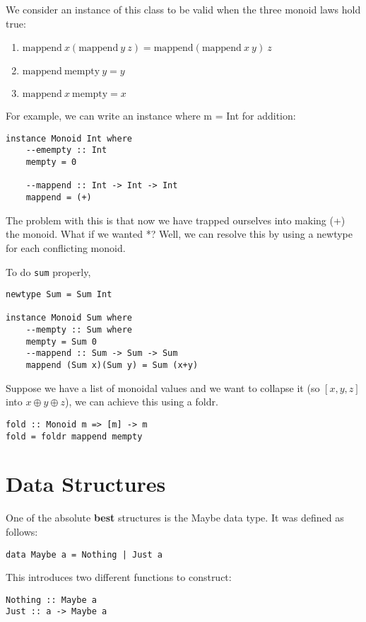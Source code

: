 \documentclass[11pt,a4paper,titlepage]{scrartcl}
\begin{document}
We consider an instance of this class to be valid when the three monoid
laws hold true:
\begin{enumerate}
    \item $\text{mappend} \ x (\text{mappend} \ y \ z) = \text{mappend}
        (\text{mappend} \ x \ y) \ z$
    \item $\text{mappend} \ \text{mempty} \ y = y$
    \item $\text{mappend} \ x \ \text{mempty} = x$
\end{enumerate}

For example, we can write an instance where m = Int for addition:
\begin{lstlisting}
instance Monoid Int where
    --emempty :: Int
    mempty = 0
    
    --mappend :: Int -> Int -> Int
    mappend = (+)
\end{lstlisting}

The problem with this is that now we have trapped ourselves into making
(+) the monoid. What if we wanted *? Well, we can resolve this by using a
newtype for each conflicting monoid.

To do \lstinline|sum| properly,
\begin{lstlisting}
newtype Sum = Sum Int

instance Monoid Sum where
    --mempty :: Sum where
    mempty = Sum 0
    --mappend :: Sum -> Sum -> Sum
    mappend (Sum x)(Sum y) = Sum (x+y)
\end{lstlisting}

Suppose we have a list of monoidal values and we want to collapse it (so
$[x, y, z]$ into $x \oplus y \oplus z$), we can achieve this using a
foldr.

\begin{lstlisting}
fold :: Monoid m => [m] -> m
fold = foldr mappend mempty
\end{lstlisting}

\section{Data Structures}%
\label{sec:structs}
One of the absolute \textbf{best} structures is the Maybe data type. It
was defined as follows:
\begin{lstlisting}
data Maybe a = Nothing | Just a
\end{lstlisting}

This introduces two different functions to construct:
\begin{lstlisting}
Nothing :: Maybe a
Just :: a -> Maybe a
\end{lstlisting}
\end{document}
